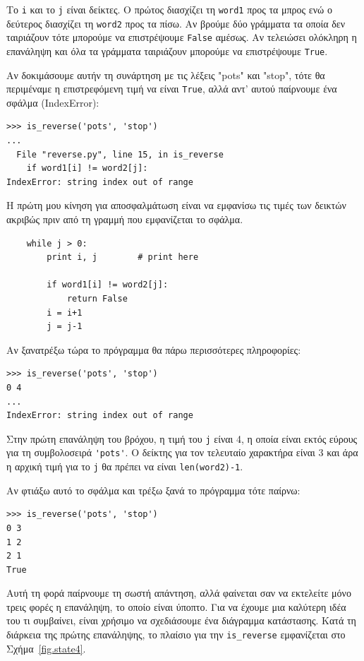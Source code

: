 \documentclass[10pt]{book}
\begin{document}
Το {\tt i} και το {\tt j} είναι δείκτες. Ο πρώτος διασχίζει τη {\tt word1}
προς τα μπρος ενώ ο δεύτερος διασχίζει τη {\tt word2} προς τα πίσω. Αν βρούμε δύο γράμματα τα οποία δεν ταιριάζουν τότε μπορούμε να επιστρέψουμε {\tt False} αμέσως. Αν τελειώσει ολόκληρη η επανάληψη και όλα τα γράμματα ταιριάζουν μπορούμε να επιστρέψουμε {\tt True}.

Αν δοκιμάσουμε αυτήν τη συνάρτηση με τις λέξεις "pots" και "stop", τότε θα 
περιμέναμε η επιστρεφόμενη τιμή να είναι {\tt True}, αλλά αντ' αυτού παίρνουμε ένα σφάλμα (IndexError):

\begin{verbatim}
>>> is_reverse('pots', 'stop')
...
  File "reverse.py", line 15, in is_reverse
    if word1[i] != word2[j]:
IndexError: string index out of range
\end{verbatim}
%

Η πρώτη μου κίνηση για αποσφαλμάτωση είναι να εμφανίσω τις τιμές των δεικτών ακριβώς πριν από τη γραμμή που εμφανίζεται το σφάλμα.

\begin{verbatim}
    while j > 0:
        print i, j        # print here

        if word1[i] != word2[j]:
            return False
        i = i+1
        j = j-1
\end{verbatim}
%

Αν ξανατρέξω τώρα το πρόγραμμα θα πάρω περισσότερες πληροφορίες:

\begin{verbatim}
>>> is_reverse('pots', 'stop')
0 4
...
IndexError: string index out of range
\end{verbatim}
%

Στην πρώτη επανάληψη του βρόχου, η τιμή του {\tt j} είναι 4, η οποία είναι εκτός εύρους για τη συμβολοσειρά \verb"'pots'". Ο δείκτης για τον τελευταίο χαρακτήρα είναι 3 και άρα η αρχική τιμή για το {\tt j} θα πρέπει να είναι {\tt len(word2)-1}.


Αν φτιάξω αυτό το σφάλμα και τρέξω ξανά το πρόγραμμα τότε παίρνω:

\begin{verbatim}
>>> is_reverse('pots', 'stop')
0 3
1 2
2 1
True
\end{verbatim}
%

Αυτή τη φορά παίρνουμε τη σωστή απάντηση, αλλά φαίνεται σαν να εκτελείτε μόνο τρεις φορές η επανάληψη, το οποίο είναι ύποπτο. Για να έχουμε μια καλύτερη ιδέα του τι συμβαίνει, είναι χρήσιμο να σχεδιάσουμε ένα διάγραμμα κατάστασης. Κατά τη διάρκεια της πρώτης επανάληψης, το πλαίσιο για την  \verb"is_reverse" 
εμφανίζεται στο Σχήμα~\ref{fig.state4}. 
\end{document}
